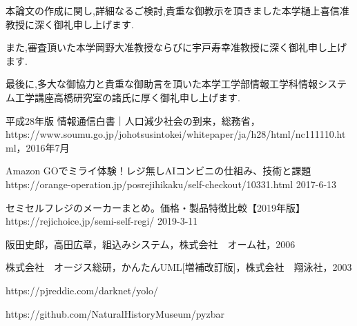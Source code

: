 本論文の作成に関し,詳細なるご検討,貴重な御教示を頂きました本学樋上喜信准教授に深く御礼申し上げます.

また,審査頂いた本学岡野大准教授ならびに宇戸寿幸准教授に深く御礼申し上げます.

最後に,多大な御協力と貴重な御助言を頂いた本学工学部情報工学科情報システム工学講座高橋研究室の諸氏に厚く御礼申し上げます.


\begin{thebibliography}{99}

平成28年版 情報通信白書｜人口減少社会の到来，総務省，https://www.soumu.go.jp/johotsusintokei/whitepaper/ja/h28/html/nc111110.html，2016年7月

Amazon GOでミライ体験！レジ無しAIコンビニの仕組み、技術と課題 https://orange-operation.jp/posrejihikaku/self-checkout/10331.html 2017-6-13

セミセルフレジのメーカーまとめ。価格・製品特徴比較【2019年版】 https://rejichoice.jp/semi-self-regi/
2019-3-11

阪田史郎，高田広章，組込みシステム，株式会社　オーム社，2006

株式会社　オージス総研，かんたんUML[増補改訂版]，株式会社　翔泳社，2003

https://pjreddie.com/darknet/yolo/

https://github.com/NaturalHistoryMuseum/pyzbar


\end{thebibliography}

